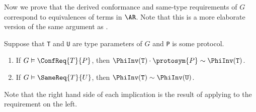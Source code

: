 \documentclass[../generics]{subfiles}
\begin{document}
Now we prove that the derived conformance and same-type requirements of $G$ correspond to equivalences of terms in $\AR$. Note that this is a more elaborate version of the same argument as .
\begin{theorem}\label{derivation to path swift}
Suppose that \texttt{T} and \texttt{U} are type parameters of $G$ and \texttt{P} is some protocol.
\begin{enumerate}
\item If $G\vDash\ConfReq{T}{P}$, then $\PhiInv(\texttt{T})\cdot\protosym{P}\sim\PhiInv(\texttt{T})$.
\item If $G\vDash\SameReq{T}{U}$, then $\PhiInv(\texttt{T})\sim\PhiInv(\texttt{U})$.
\end{enumerate}
Note that the right hand side of each implication is the result of applying  to the requirement on the left.
\end{theorem}
\end{document}
